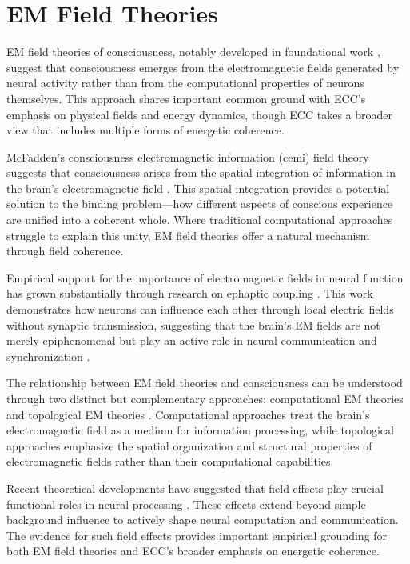 \section{EM Field Theories}

EM field theories of consciousness, notably developed in foundational work \cite{McFadden2002, McFadden2020}, suggest that consciousness emerges from the electromagnetic fields generated by neural activity rather than from the computational properties of neurons themselves. This approach shares important common ground with ECC's emphasis on physical fields and energy dynamics, though ECC takes a broader view that includes multiple forms of energetic coherence.

McFadden's consciousness electromagnetic information (cemi) field theory suggests that consciousness arises from the spatial integration of information in the brain's electromagnetic field \cite{McFadden2002}. This spatial integration provides a potential solution to the binding problem—how different aspects of conscious experience are unified into a coherent whole. Where traditional computational approaches struggle to explain this unity, EM field theories offer a natural mechanism through field coherence.

Empirical support for the importance of electromagnetic fields in neural function has grown substantially through research on ephaptic coupling \cite{Radman2007}. This work demonstrates how neurons can influence each other through local electric fields without synaptic transmission, suggesting that the brain's EM fields are not merely epiphenomenal but play an active role in neural communication and synchronization \cite{Frohlich2010}.

The relationship between EM field theories and consciousness can be understood through two distinct but complementary approaches: computational EM theories and topological EM theories \cite{Pockett2012}. Computational approaches treat the brain's electromagnetic field as a medium for information processing, while topological approaches emphasize the spatial organization and structural properties of electromagnetic fields rather than their computational capabilities.

Recent theoretical developments have suggested that field effects play crucial functional roles in neural processing \cite{Weiss2010}. These effects extend beyond simple background influence to actively shape neural computation and communication. The evidence for such field effects provides important empirical grounding for both EM field theories and ECC's broader emphasis on energetic coherence.

